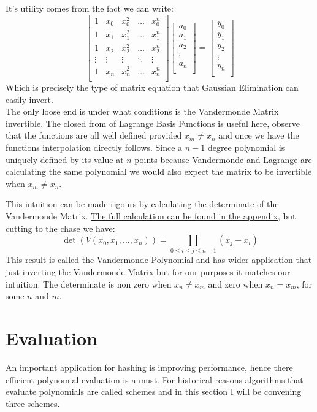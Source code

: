 It's utility comes from the fact we can write:
\[
\begin{bmatrix} 
	1&x_0&x_0^2&\dots&x_0^n \\
	1&x_1&x_1^2&\dots&x_1^n \\
	1&x_2&x_2^2&\dots&x_2^n \\
	\vdots&\vdots&\vdots&\ddots&\vdots \\
	1&x_n&x_n^2&\dots&x_n^n \\
\end{bmatrix}
\begin{bmatrix}
	a_0\\a_1\\a_2\\\vdots\\a_n\\
\end{bmatrix}
=
\begin{bmatrix}
	y_0\\y_1\\y_2\\\vdots\\y_n\\
\end{bmatrix}
\]
Which is precisely the type of matrix equation that Gaussian Elimination can easily invert.
\\

The only loose end is under what conditions is the Vandermonde Matrix invertible.
The closed from of Lagrange Basis Functions is useful here,
observe that the functions are all well defined provided $x_m \neq x_n$ and once we have the functions interpolation directly follows.
Since a $n-1$ degree polynomial is uniquely defined by its value at $n$ points because Vandermonde and Lagrange are calculating the same polynomial we would also expect the matrix to be invertible when $x_m \neq x_n$.

This intuition can be made rigours by calculating the determinate of the Vandermonde Matrix.
\hyperref[appx:vandermonde-polynomial]{The full calculation can be found in the appendix,}
but cutting to the chase we have:
\[\det(V(x_0,x_1,\dots,x_n)) = \prod_{0\leq i \leq j \leq n-1}(x_j-x_i)\]
This result is called the Vandermonde Polynomial and has wider application that just inverting the Vandermonde Matrix but for our purposes it matches our intuition.
The determinate is non zero when $x_n\neq x_m$ and zero when $x_n=x_m$, for some $n$ and $m$.

\section{Evaluation}
An important application for hashing is improving performance,
hence there efficient polynomial evaluation is a must.
For historical reasons algorithms that evaluate polynomials are called schemes and in this section I will be convening three schemes.

